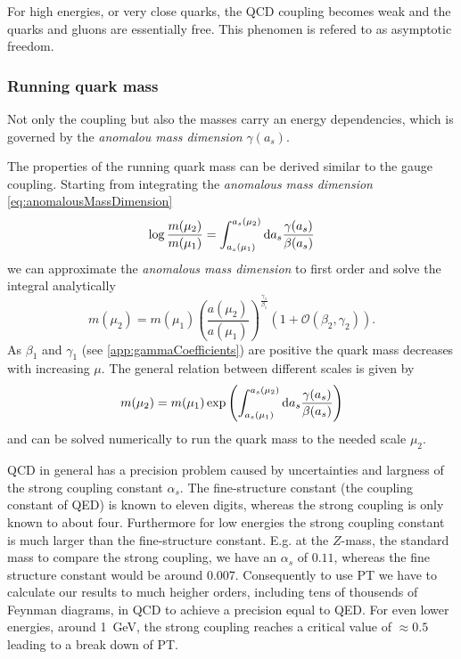 \documentclass[../../index.tex]{subfiles}
\begin{document}
For high energies, or very close quarks, the QCD coupling becomes weak and the
quarks and gluons are essentially free. This phenomen is refered to as
asymptotic freedom. 


\subsubsection{Running quark mass}
Not only the coupling but also the masses carry an energy dependencies, which is
governed by the \textit{anomalou mass dimension} $\gamma(a_s)$.

The properties of the running quark mass can be derived similar to the gauge
coupling. Starting from integrating the \textit{anomalous mass dimension} \ref{eq:anomalousMassDimension}
\begin{equation}
  \log \frac{m(\mu_2)}{m(\mu_1)} = \int_{a_s(\mu_1)}^{a_s(\mu_2)} \dif a_s \frac{\gamma(a_s)}{\beta(a_s)}
\end{equation}
we can approximate the \textit{anomalous mass dimension} to first order and
solve the integral analytically \cite{Schwab2002}
\begin{equation}
  m(\mu_2) = m(\mu_1)\left( \frac{a(\mu_2)}{a(\mu_1)} \right)^{\frac{\gamma_1}{\beta_1}} \left( 1 + \mathcal{O}(\beta_2, \gamma_2) \right).
\end{equation}
As $\beta_1$ and $\gamma_1$ (see \ref{app:gammaCoefficients}) are positive the
quark mass decreases with increasing $\mu$.
The general relation between different scales is given by
\begin{equation}
  m(\mu_2) = m(\mu_1) \exp \left( \int_{a_s(\mu_1)}^{a_s(\mu_2)} \dif a_s \frac{\gamma(a_s)}{\beta(a_s)}  \right)
\end{equation}
and can be solved numerically to run the quark mass to the needed scale $\mu_2$.

QCD in general has a precision problem caused by uncertainties and largness of the strong
coupling constant $\alpha_s$. The fine-structure constant (the coupling constant
of QED) is known to eleven digits, whereas the strong coupling is only known to
about four. Furthermore for low energies the strong coupling constant is much
larger than the fine-structure constant. E.g. at the $Z$-mass, the standard mass
to compare the strong coupling, we have an $\alpha_s$ of $0.11$, whereas the
fine structure constant would be around $0.007$. Consequently to use PT we have to
calculate our results to much heigher orders, including tens of thousends of
Feynman diagrams, in QCD to achieve a precision equal to QED. For even lower
energies, around \SI{1}{\giga\eV}, the strong coupling reaches a critical value
of $\approx 0.5$ leading to a break down of PT.
\end{document}
